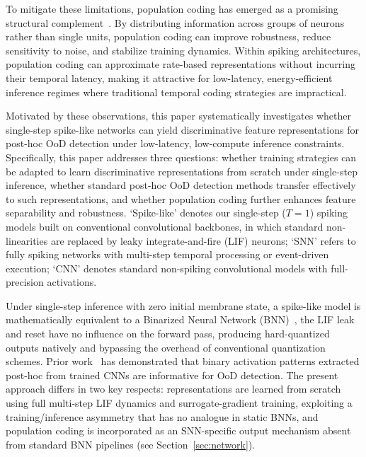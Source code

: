 \documentclass{ieeeaccess}
\begin{document}
To mitigate these limitations, population coding has emerged as a promising structural complement~\cite{eliasmith2003neural}. By distributing information across groups of neurons rather than single units, population coding can improve robustness, reduce sensitivity to noise, and stabilize training dynamics. Within spiking architectures, population coding can approximate rate-based representations without incurring their temporal latency, making it attractive for low-latency, energy-efficient inference regimes where traditional temporal coding strategies are impractical.

Motivated by these observations, this paper systematically investigates whether single-step spike-like networks can yield discriminative feature representations for post-hoc OoD detection under low-latency, low-compute inference constraints. Specifically, this paper addresses three questions: whether training strategies can be adapted to learn discriminative representations from scratch under single-step inference, whether standard post-hoc OoD detection methods transfer effectively to such representations, and whether population coding further enhances feature separability and robustness. `Spike-like' denotes our single-step ($T=1$) spiking models built on conventional convolutional backbones, in which standard non-linearities are replaced by leaky integrate-and-fire (LIF) neurons; `SNN' refers to fully spiking networks with multi-step temporal processing or event-driven execution; `CNN' denotes standard non-spiking convolutional models with full-precision activations. 

Under single-step inference with zero initial membrane state, a spike-like model is mathematically equivalent to a Binarized Neural Network (BNN)~\cite{courbariaux2016binarized}, the LIF leak and reset have no influence on the forward pass, producing hard-quantized outputs natively and bypassing the overhead of conventional quantization schemes. Prior work~\cite{Olber2022DetectionOO} has demonstrated that binary activation patterns extracted post-hoc from trained CNNs are informative for OoD detection. The present approach differs in two key respects: representations are learned from scratch using full multi-step LIF dynamics and surrogate-gradient training, exploiting a training/inference asymmetry that has no analogue in static BNNs, and population coding is incorporated as an SNN-specific output mechanism absent from standard BNN pipelines (see Section~\ref{sec:network}).
\end{document}
